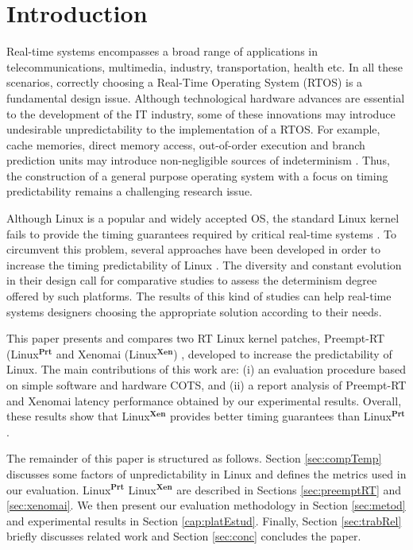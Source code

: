 \documentclass{acm_proc_article-sp}
\newcommand{\preemptt}{{Preempt-RT }}
\begin{document}
\section{Introduction}

Real-time systems encompasses a broad range of applications in telecommunications,
multimedia, industry, transportation, health etc. In all these scenarios, correctly
choosing a Real-Time Operating System (RTOS) is a fundamental design issue. Although
technological hardware advances are essential to the development of the IT industry,
some of these innovations may introduce undesirable unpredictability to the
implementation of a RTOS. For example, cache memories, direct memory access,
out-of-order execution and branch prediction units may introduce non-negligible
sources of indeterminism \cite{Liu00, Pratt04}. Thus, the construction of a general
purpose operating system with a focus on timing predictability remains a challenging
research issue.

Although Linux is a popular and widely accepted OS, the standard Linux kernel
\cite{Bovet05} fails to provide the timing guarantees required by critical real-time
systems \cite{Marchesotti06, Abeni02}. To circumvent this problem, several
approaches have been developed in order to increase the timing predictability of
Linux \cite{PreemptRT, Xenomai, Dozio03, rtLinux, Fry07, Calandrino06}. The
diversity and constant evolution in their design call for comparative studies to
assess the determinism degree offered by such platforms. The results of this kind
of studies can help real-time systems designers choosing the appropriate solution
according to their needs.

This paper presents and compares two RT Linux kernel patches, \preemptt
(Linux$^{\mathbf{Prt}}$ \cite{PreemptRT} and Xenomai (Linux$^{\mathbf{Xen}}$)
\cite{Xenomai}, developed to increase the predictability of Linux. The main
contributions of this work are: (i) an evaluation procedure based on simple software
and hardware COTS, and (ii) a report analysis of \preemptt and Xenomai latency performance
obtained by our experimental results. Overall, these results show that
Linux$^{\mathbf{Xen}}$ provides better timing guarantees than
Linux$^{\mathbf{Prt}}$.

The remainder of this paper is structured as follows. Section \ref{sec:compTemp}
discusses some factors of unpredictability in Linux and defines the metrics used in
our evaluation. Linux$^{\mathbf{Prt}}$ Linux$^{\mathbf{Xen}}$ are described in
Sections \ref{sec:preemptRT} and \ref{sec:xenomai}. We then present our evaluation
methodology in Section \ref{sec:metod} and experimental results in Section
\ref{cap:platEstud}.  Finally, Section \ref{sec:trabRel} briefly discusses related
work and Section \ref{sec:conc} concludes the paper.
\end{document}
